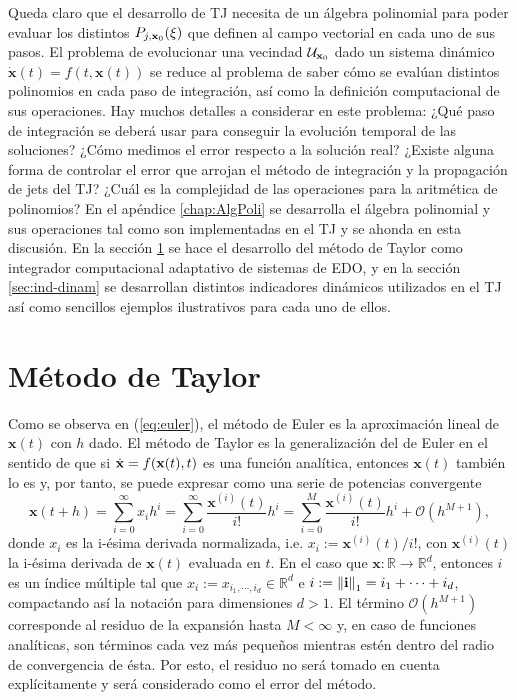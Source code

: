 Queda claro que el desarrollo de TJ necesita de un álgebra polinomial para poder evaluar los distintos $P_{j,\mathbf{x}_0}(\xi)$ que definen al campo vectorial en cada uno de sus pasos. El problema de evolucionar una vecindad $\mathcal{U}_{\mathbf{x}_0}$ dado un sistema dinámico $\dot{\mathbf{x}}(t) = f(t,\mathbf{x}(t))$ se reduce al problema de saber cómo se evalúan distintos polinomios en cada paso de integración, así como la definición computacional de sus operaciones. Hay muchos detalles a considerar en este problema: ¿Qué paso de integración se deberá usar para conseguir la evolución temporal de las soluciones? ¿Cómo medimos el error respecto a la solución real? ¿Existe alguna forma de controlar el error que arrojan el método de integración y la propagación de jets del TJ? ¿Cuál es la complejidad de las operaciones para la aritmética de polinomios? En el apéndice \ref{chap:AlgPoli} se desarrolla el álgebra polinomial y sus operaciones tal como son implementadas en el TJ y se ahonda en esta discusión. En la sección \ref{sec:taylor-metodo} se hace el desarrollo del método de Taylor como integrador computacional adaptativo de sistemas de EDO, y en la sección \ref{sec:ind-dinam} se desarrollan distintos indicadores dinámicos utilizados en el TJ así como sencillos ejemplos ilustrativos para cada uno de ellos.

\section{Método de Taylor}
\label{sec:taylor-metodo}

Como se observa en (\ref{eq:euler}), el método de Euler es la aproximación lineal de $\mathbf{x}(t)$ con $h$ dado. El método de Taylor es la generalización del de Euler en el sentido de que si $\dot{\mathbf{x}} = f(\mathbf{x}(t),t)$ es una función analítica, entonces $\mathbf{x}(t)$ también lo es y, por tanto, se puede expresar como una serie de potencias convergente 
\begin{equation}
\mathbf{x}(t + h) = \sum_{i=0}^\infty x_i h^i = \sum_{i=0}^\infty \frac{\mathbf{x}^{(i)}(t)}{i!}h^i 
= \sum_{i=0}^M \frac{\mathbf{x}^{(i)}(t)}{i!}h^i + \mathcal{O}(h^{M+1}),
\label{eq:anal-exp}
\end{equation}
donde $x_i$ es la i-ésima derivada normalizada, i.e. $x_i  := \mathbf{x}^{(i)}(t)/i! $, con $\mathbf{x}^{(i)}(t)$ la i-ésima derivada de $\mathbf{x}(t)$ evaluada en $t$. En el caso que $\mathbf{x}: \mathbb{R} \to \mathbb{R}^d$, entonces $i$ es un índice múltiple tal que $x_i := x_{i_1,\cdots,i_d} \in \mathbb{R}^d$ e $i :=\left\lVert\mathbf{i}\right\rVert_1 = i_1 + \cdots + i_d$, compactando así la notación para dimensiones $d > 1$. El término $\mathcal{O}(h^{M+1})$ corresponde al residuo de la expansión hasta $M < \infty$ y, en caso de funciones analíticas, son términos cada vez más pequeños mientras estén dentro del radio de convergencia de ésta. Por esto, el residuo no será tomado en cuenta explícitamente y será considerado como el error del método.

